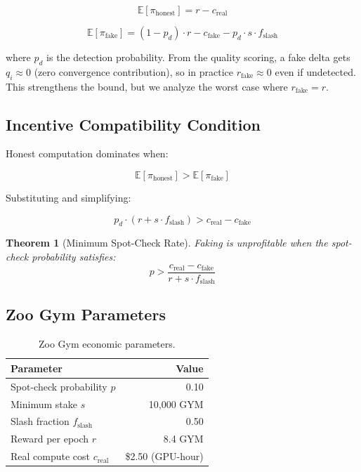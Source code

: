 \documentclass[11pt,letterpaper]{article}
\newtheorem{theorem}{Theorem}[section]
\begin{document}
\begin{equation}
    \mathbb{E}[\pi_{\text{honest}}] = r - c_{\text{real}}
\end{equation}

\begin{equation}
    \mathbb{E}[\pi_{\text{fake}}] = (1 - p_d) \cdot r - c_{\text{fake}} - p_d \cdot s \cdot f_{\text{slash}}
    \label{eq:fake-payoff}
\end{equation}

where $p_d$ is the detection probability.  From the quality scoring, a fake delta gets $q_i \approx 0$ (zero convergence contribution), so in practice $r_{\text{fake}} \approx 0$ even if undetected.  This strengthens the bound, but we analyze the worst case where $r_{\text{fake}} = r$.

\subsection{Incentive Compatibility Condition}

Honest computation dominates when:

\begin{equation}
    \mathbb{E}[\pi_{\text{honest}}] > \mathbb{E}[\pi_{\text{fake}}]
\end{equation}

Substituting and simplifying:

\begin{equation}
    p_d \cdot (r + s \cdot f_{\text{slash}}) > c_{\text{real}} - c_{\text{fake}}
    \label{eq:ic-condition}
\end{equation}

\begin{theorem}[Minimum Spot-Check Rate]
Faking is unprofitable when the spot-check probability satisfies:
\begin{equation}
    p > \frac{c_{\text{real}} - c_{\text{fake}}}{r + s \cdot f_{\text{slash}}}
    \label{eq:min-p}
\end{equation}
\end{theorem}

\subsection{Zoo Gym Parameters}

\begin{table}[t]
\centering
\begin{tabular}{lr}
\toprule
\textbf{Parameter} & \textbf{Value} \\
\midrule
Spot-check probability $p$ & 0.10 \\
Minimum stake $s$ & 10{,}000 GYM \\
Slash fraction $f_{\text{slash}}$ & 0.50 \\
Reward per epoch $r$ & 8.4 GYM \\
Real compute cost $c_{\text{real}}$ & \$2.50 (GPU-hour) \\
\bottomrule
\end{tabular}
\caption{Zoo Gym economic parameters.}
\label{tab:params}
\end{table}
\end{document}
